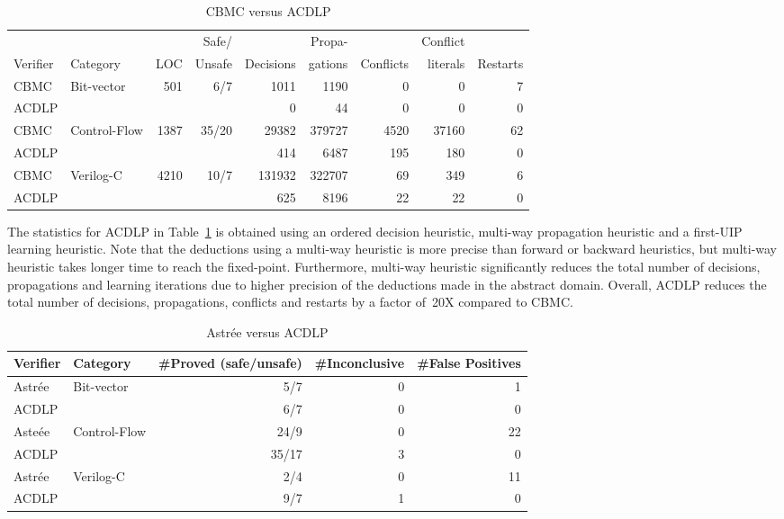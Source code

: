 \begin{table}[!b]
\begin{center}
{
\begin{tabular}{l|l|r|r|r|r|r|r|r}
\hline
           &          &     & Safe/  &           & Propa-  &           & Conflict &          \\
  Verifier & Category & LOC & Unsafe & Decisions & gations & Conflicts & literals & Restarts \\ \hline
  CBMC & \multirow{2}{*}{Bit-vector} & \multirow{2}{*}{501} &
  \multirow{2}{*}{6/7} & 1011 & 1190 & 0 & 0 & 7 \\
  ACDLP & & & & 0 & 44 & 0 & 0 & 0 \\ \hline
  CBMC & \multirow{2}{*}{Control-Flow} & \multirow{2}{*}{1387} & 
  \multirow{2}{*}{35/20} & 29382 & 379727 & 4520 & 37160 & 62 \\ 
  ACDLP & & & & 414 & 6487 & 195 & 180 & 0  \\ \hline
  CBMC & \multirow{2}{*}{Verilog-C} & \multirow{2}{*}{4210} & 
  \multirow{2}{*}{10/7} & 131932 & 322707 & 69 & 349 & 6 \\ 
  ACDLP & & & & 625 & 8196 & 22 & 22 & 0 \\ \hline
\end{tabular}
}
\end{center}
\caption{CBMC versus ACDLP}
\label{detailed_result}
\end{table}

The statistics for ACDLP in Table~\ref{detailed_result} is obtained using an
ordered decision heuristic, multi-way propagation heuristic and a first-UIP
learning heuristic.  Note that the deductions using a multi-way heuristic is
more precise than forward or backward heuristics, but multi-way heuristic
takes longer time to reach the fixed-point.  Furthermore, multi-way
heuristic significantly reduces the total number of decisions, propagations
and learning iterations due to higher precision of the deductions made in
the abstract domain.  Overall, ACDLP reduces the total number of decisions,
propagations, conflicts and restarts by a factor of~20X compared to CBMC.

\begin{table}[t]
\begin{center}
{
\begin{tabular}{l|l|r|r|r}
\hline
  Verifier & Category & \#Proved (safe/unsafe) & \#Inconclusive & \#False Positives \\ \hline
  Astr{\'e}e & \multirow{2}{*}{Bit-vector} & 5/7 & 0 & 1 \\
  ACDLP & & 6/7 & 0 & 0 \\ \hline
  Aste{\'e}e & \multirow{2}{*}{Control-Flow} & 24/9 & 0 & 22 \\
  ACDLP & & 35/17 & 3 & 0 \\ \hline
  Astr{\'e}e & \multirow{2}{*}{Verilog-C} & 2/4 & 0 & 11 \\
  ACDLP & & 9/7 & 1 & 0 \\ \hline
\end{tabular}
}
\end{center}
  \caption{Astr{\'e}e versus ACDLP}
\label{ai-result}
\end{table}

